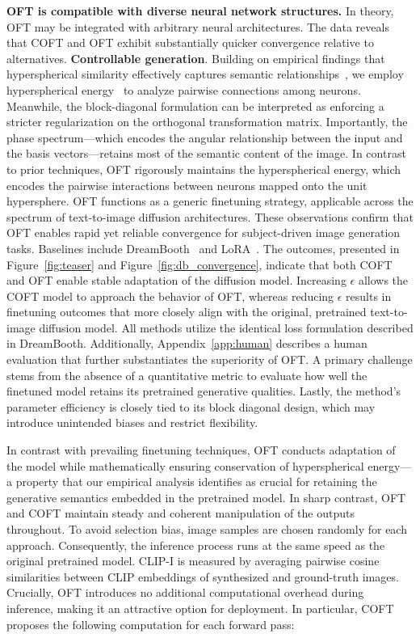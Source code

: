 \textbf{OFT is compatible with diverse neural network structures.} In theory, OFT may be integrated with arbitrary neural architectures. The data reveals that COFT and OFT exhibit substantially quicker convergence relative to alternatives. \textbf{Controllable generation}. Building on empirical findings that hyperspherical similarity effectively captures semantic relationships~\cite{liu2017deep,liu2018decoupled,chen2020angular}, we employ hyperspherical energy~\cite{liu2018learning} to analyze pairwise connections among neurons. Meanwhile, the block-diagonal formulation can be interpreted as enforcing a stricter regularization on the orthogonal transformation matrix. Importantly, the phase spectrum—which encodes the angular relationship between the input and the basis vectors—retains most of the semantic content of the image. In contrast to prior techniques, OFT rigorously maintains the hyperspherical energy, which encodes the pairwise interactions between neurons mapped onto the unit hypersphere. OFT functions as a generic finetuning strategy, applicable across the spectrum of text-to-image diffusion architectures. These observations confirm that OFT enables rapid yet reliable convergence for subject-driven image generation tasks. Baselines include DreamBooth~\cite{ruiz2023dreambooth} and LoRA~\cite{hulora2022}. The outcomes, presented in Figure~\ref{fig:teaser} and Figure~\ref{fig:db_convergence}, indicate that both COFT and OFT enable stable adaptation of the diffusion model. Increasing $\epsilon$ allows the COFT model to approach the behavior of OFT, whereas reducing $\epsilon$ results in finetuning outcomes that more closely align with the original, pretrained text-to-image diffusion model. All methods utilize the identical loss formulation described in DreamBooth. Additionally, Appendix~\ref{app:human} describes a human evaluation that further substantiates the superiority of OFT. A primary challenge stems from the absence of a quantitative metric to evaluate how well the finetuned model retains its pretrained generative qualities. Lastly, the method’s parameter efficiency is closely tied to its block diagonal design, which may introduce unintended biases and restrict flexibility. \item In contrast with prevailing finetuning techniques, OFT conducts adaptation of the model while mathematically ensuring conservation of hyperspherical energy—a property that our empirical analysis identifies as crucial for retaining the generative semantics embedded in the pretrained model. In sharp contrast, OFT and COFT maintain steady and coherent manipulation of the outputs throughout. To avoid selection bias, image samples are chosen randomly for each approach. Consequently, the inference process runs at the same speed as the original pretrained model. CLIP-I is measured by averaging pairwise cosine similarities between CLIP embeddings of synthesized and ground-truth images. Crucially, OFT introduces no additional computational overhead during inference, making it an attractive option for deployment. In particular, COFT proposes the following computation for each forward pass:

